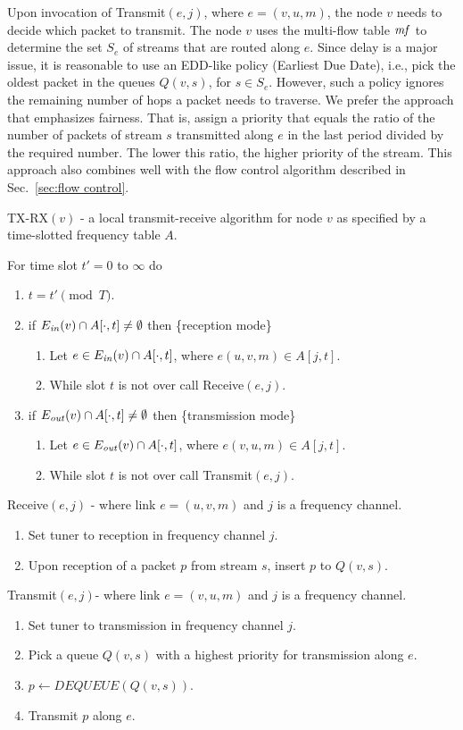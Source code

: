 \documentclass[12pt]{article}
\newenvironment{proof sketch}[1]{\noindent {\emph{Proof sketch of #1:}}}{\hfill \qed}
\newcommand{\mf}{\text{\emph{mf}}}
\newcommand{\Ein}{E_{\text{\emph{in}}}}
\newcommand{\Eout}{E_{\text{\emph{out}}}}
\begin{document}
Upon invocation of Transmit$(e,j)$, where $e=(v,u,m)$, the node $v$
needs to decide which packet to transmit. The node $v$ uses the
multi-flow table $\mf$ to determine the set $S_e$ of streams that are
routed along $e$.  Since delay is a major issue, it is reasonable to
use an EDD-like policy (Earliest Due Date), i.e., pick the oldest packet in the queues
$Q(v,s)$, for $s\in S_e$.  However, such a policy ignores the
remaining number of hops a packet needs to traverse. We prefer the
approach that emphasizes fairness. That is, assign a priority that
equals the ratio of the number of packets of stream $s$ transmitted
along $e$ in the last period divided by the required number. The lower
this ratio, the higher priority of the stream. This approach also
combines well with the flow control algorithm described in
Sec.~\ref{sec:flow control}.


\begin{algorithm}[H]
  \caption{TX-RX$(v)$ - a local transmit-receive algorithm for node
    $v$ as specified by a time-slotted frequency table $A$.}
\label{alg:tx-rx}
For time slot $t'=0$ to $\infty$ do
  \begin{enumerate}%
\item $t = t' \pmod T$.
  \item if $\Ein(v)\cap A[\cdot,t ]\neq \emptyset$ then
    \{reception mode\}
    \begin{enumerate}%
    \item Let $e\in \Ein(v)\cap A[\cdot,t]$, where $e(u,v,m)\in
      A[j,t]$.
    \item While slot $t$ is not over call Receive$(e,j)$.
    \end{enumerate}%
  \item if $\Eout(v)\cap A[\cdot,t ]\neq \emptyset$ then
    \{transmission mode\}
    \begin{enumerate}%
    \item Let $e\in \Eout(v)\cap A[\cdot,t ]$, where
      $e(v,u,m)\in A[j,t]$.
    \item While slot $t$ is not over call Transmit$(e,j)$.
    \end{enumerate}%
  \end{enumerate}%
Receive$(e,j)$ - where link $e=(u,v,m)$ and $j$ is a frequency channel.
\begin{enumerate}
\item Set tuner to reception in frequency channel $j$.
\item Upon reception of a packet $p$ from stream $s$, insert $p$ to $Q(v,s)$.
\end{enumerate}

Transmit$(e,j)$-  where link $e=(v,u,m)$ and $j$ is a frequency channel.
\begin{enumerate}
\item Set tuner to transmission in frequency channel $j$.
\item\label{line:priority} Pick a queue $Q(v,s)$ with a highest priority for transmission along $e$.
\item $p \gets DEQUEUE(Q(v,s))$.
\item Transmit $p$ along $e$.
\end{enumerate}
\end{algorithm}
\end{document}
